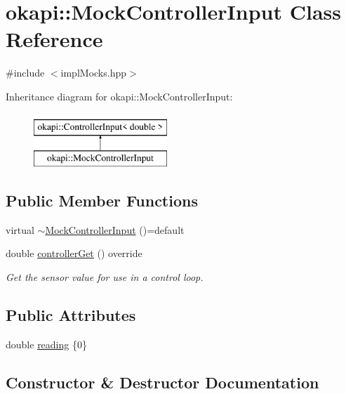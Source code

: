 \hypertarget{classokapi_1_1MockControllerInput}{}\section{okapi\+::Mock\+Controller\+Input Class Reference}
\label{classokapi_1_1MockControllerInput}


{\ttfamily \#include $<$impl\+Mocks.\+hpp$>$}

Inheritance diagram for okapi\+::Mock\+Controller\+Input\+:\begin{figure}[H]
\begin{center}
\leavevmode
\includegraphics[height=2.000000cm]{classokapi_1_1MockControllerInput}
\end{center}
\end{figure}
\subsection*{Public Member Functions}
\begin{DoxyCompactItemize}
\item 
virtual \mbox{\hyperlink{classokapi_1_1MockControllerInput_adddf4c2507e1e27f475e868c1d6b670e}{$\sim$\+Mock\+Controller\+Input}} ()=default
\item 
double \mbox{\hyperlink{classokapi_1_1MockControllerInput_afb1bf896f873aeca0cc2c677f4a90cc0}{controller\+Get}} () override
\begin{DoxyCompactList}\small\item\em Get the sensor value for use in a control loop. \end{DoxyCompactList}\end{DoxyCompactItemize}
\subsection*{Public Attributes}
\begin{DoxyCompactItemize}
\item 
double \mbox{\hyperlink{classokapi_1_1MockControllerInput_a9fe81baaaabb4b7d2eb5e0782bd93873}{reading}} \{0\}
\end{DoxyCompactItemize}


\subsection{Constructor \& Destructor Documentation}
\mbox{\label{classokapi_1_1MockControllerInput_adddf4c2507e1e27f475e868c1d6b670e}} 
